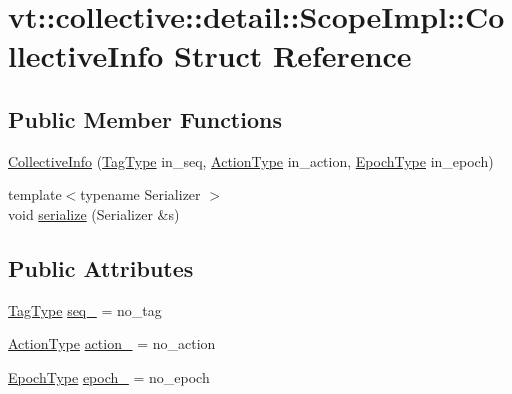 \hypertarget{structvt_1_1collective_1_1detail_1_1_scope_impl_1_1_collective_info}{}\section{vt\+:\+:collective\+:\+:detail\+:\+:Scope\+Impl\+:\+:Collective\+Info Struct Reference}
\label{structvt_1_1collective_1_1detail_1_1_scope_impl_1_1_collective_info}
\subsection*{Public Member Functions}
\begin{DoxyCompactItemize}
\item 
\hyperlink{structvt_1_1collective_1_1detail_1_1_scope_impl_1_1_collective_info_a6c03d32c5e4fd0239bdb4e62e5971e37}{Collective\+Info} (\hyperlink{namespacevt_a84ab281dae04a52a4b243d6bf62d0e52}{Tag\+Type} in\+\_\+seq, \hyperlink{namespacevt_ae0a5a7b18cc99d7b732cb4d44f46b0f3}{Action\+Type} in\+\_\+action, \hyperlink{namespacevt_a985a5adf291c34a3ca263b3378388236}{Epoch\+Type} in\+\_\+epoch)
\item 
{\footnotesize template$<$typename Serializer $>$ }\\void \hyperlink{structvt_1_1collective_1_1detail_1_1_scope_impl_1_1_collective_info_ad4e92049edc72a4ff681d34056653588}{serialize} (Serializer \&s)
\end{DoxyCompactItemize}
\subsection*{Public Attributes}
\begin{DoxyCompactItemize}
\item 
\hyperlink{namespacevt_a84ab281dae04a52a4b243d6bf62d0e52}{Tag\+Type} \hyperlink{structvt_1_1collective_1_1detail_1_1_scope_impl_1_1_collective_info_ae8212822c750374cb79a37fe0ef21d7e}{seq\+\_\+} = no\+\_\+tag
\item 
\hyperlink{namespacevt_ae0a5a7b18cc99d7b732cb4d44f46b0f3}{Action\+Type} \hyperlink{structvt_1_1collective_1_1detail_1_1_scope_impl_1_1_collective_info_a60c9ddcd8da8dbab5b66fcef3b6f8ce9}{action\+\_\+} = no\+\_\+action
\item 
\hyperlink{namespacevt_a985a5adf291c34a3ca263b3378388236}{Epoch\+Type} \hyperlink{structvt_1_1collective_1_1detail_1_1_scope_impl_1_1_collective_info_a36a452ee7268f79249b791b76d81e3ec}{epoch\+\_\+} = no\+\_\+epoch
\end{DoxyCompactItemize}


